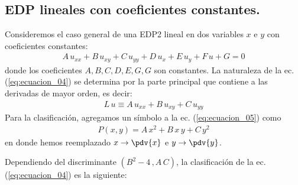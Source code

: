 \subsection{EDP lineales con coeficientes constantes.}
Consideremos el caso general de una EDP2 lineal en dos variables $x$ e $y$ con coeficientes constantes:
\begin{align}
A \, u_{xx} + B \, u_{xy} + C \, u_{yy} + D \, u_{x} + E \, u_{y} + F \, u + G = 0
\label{eq:ecuacion_04}    
\end{align}
donde los coeficientes $A, B, C, D, E, G, G$ son constantes. La naturaleza de la ec. (\ref{eq:ecuacion_04}) se determina por la parte principal que contiene a las derivadas de mayor orden, es decir:
\begin{align}
L \, u \equiv A \, u_{xx} + B \, u_{xy} + C \, u_{yy}
\label{eq:ecuacion_05}    
\end{align}
Para la clasificación, agregamos un símbolo a la ec. (\ref{eq:ecuacion_05}) como
\begin{align*}
P(x, y) = A \, x^{2} + B \, x \, y + C \, y^{2}
\end{align*}
en donde hemos reemplazado $x \to \displaystyle \pdv{x}$ e $y \to \displaystyle \pdv{y}$.
\par
Dependiendo del discriminante $(B^{2} - 4\, , A \, C)$, la clasificación de la ec. (\ref{eq:ecuacion_04}) es la siguiente:
\begin{center}
\end{center}
